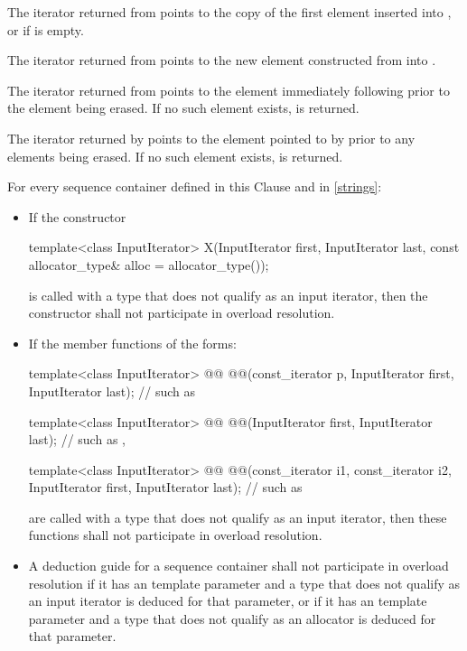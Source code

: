 \documentclass{wg21}
\begin{document}
\pnum
The iterator returned from  points to the copy of the first
element inserted into , or  if  is empty.

\pnum
The iterator returned from  points to the new element
constructed from  into .

\pnum
The iterator returned from
points to the element immediately following
prior to the element being erased.
If no such element exists,
is returned.

\pnum
The iterator returned by
points to the element pointed to by
prior to any elements being erased.
If no such element exists,
is returned.

\pnum
For every sequence container defined in this Clause and in \ref{strings}:
\begin{itemize}
    \item If the constructor
    \begin{codeblock}
        template<class InputIterator>
        X(InputIterator first, InputIterator last,
        const allocator_type& alloc = allocator_type());
    \end{codeblock}
    is called with a type  that does not qualify as an input
    iterator, then the constructor
    shall not participate in overload resolution.

    \item If the member functions of the forms:
    \begin{codeblock}
        template<class InputIterator>
        @@ @@(const_iterator p,
        InputIterator first, InputIterator last);       // such as 

        template<class InputIterator>
        @@ @@(InputIterator first, InputIterator last);       // such as , 

        template<class InputIterator>
        @@ @@(const_iterator i1, const_iterator i2,
        InputIterator first, InputIterator last);       // such as 
    \end{codeblock}
    are called with a type  that does not qualify as an input
    iterator, then these functions
    shall not participate in overload resolution.

    \item A deduction guide for a sequence container shall not participate in overload resolution
    if it has an  template parameter and a type that does not
    qualify as an input iterator is deduced for that parameter,
    or if it has an  template parameter and a type that does not
    qualify as an allocator is deduced for that parameter.
\end{itemize}
\end{document}
